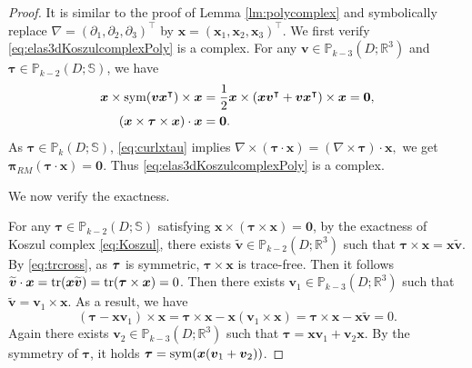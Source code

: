 \begin{proof}
It is similar to the proof of Lemma \ref{lm:polycomplex} and symbolically replace $\nabla = (\partial_1, \partial_2, \partial_3)^{\intercal}$ by $\boldsymbol  x = (\boldsymbol  x_1, \boldsymbol  x_2, \boldsymbol  x_3)^{\intercal}$. 
We first verify \eqref{eq:elas3dKoszulcomplexPoly} is a complex. For any $\boldsymbol v\in\mathbb P_{k-3}(D;\mathbb R^3)$ and $\boldsymbol\tau\in\mathbb P_{k-2}(D;\mathbb S)$, we have
\begin{align*}
\boldsymbol x\times \operatorname{sym}(\boldsymbol v\boldsymbol x^{\intercal})\times \boldsymbol x &=\frac{1}{2}\boldsymbol x\times(\boldsymbol x\boldsymbol v^{\intercal} + \boldsymbol  v\boldsymbol  x^{\intercal})\times \boldsymbol  x=\boldsymbol0,\\
(\boldsymbol x\times\boldsymbol\tau \times \boldsymbol  x)\cdot \boldsymbol  x &=\boldsymbol 0.
\end{align*}
As $\boldsymbol\tau\in\mathbb P_{k}(D;\mathbb S)$, \eqref{eq:curlxtau} implies
$\nabla \times( \boldsymbol  \tau\cdot \boldsymbol  x) =(\nabla\times \boldsymbol\tau )\cdot \boldsymbol  x,$
we get
$\boldsymbol \pi_{RM}(\boldsymbol\tau\cdot \boldsymbol  x)= \boldsymbol  0.$
Thus \eqref{eq:elas3dKoszulcomplexPoly} is a complex.

We now verify the exactness.  

\medskip
{}

For any $\boldsymbol \tau\in\mathbb P_{k-2}(D;\mathbb S)$ satisfying $\boldsymbol x\times(\boldsymbol\tau \times \boldsymbol x)=\boldsymbol  0$, by the exactness of Koszul complex \eqref{eq:Koszul}, there exists $\widetilde{\boldsymbol v}\in \mathbb P_{k-2}(D;\mathbb R^3)$ such that $\boldsymbol\tau \times \boldsymbol x=\boldsymbol x\widetilde{\boldsymbol v}$.
By \eqref{eq:trcross}, as $\boldsymbol \tau$ is symmetric, $\boldsymbol\tau \times \boldsymbol x$ is trace-free. Then it follows $\widetilde{\boldsymbol v}\cdot \boldsymbol  x = \operatorname*{tr}(\boldsymbol  x\widetilde{\boldsymbol v} ) = \operatorname*{tr} (\boldsymbol  \tau \times \boldsymbol  x) = 0$. Then there exists $\boldsymbol  v_1\in\mathbb P_{k-3}(D;\mathbb R^3)$ such that $\widetilde{\boldsymbol v}=\boldsymbol  v_1\times \boldsymbol x$. As a result, we have
$$
(\boldsymbol\tau-\boldsymbol x\boldsymbol  v_1)\times \boldsymbol x=\boldsymbol\tau \times \boldsymbol x-\boldsymbol x(\boldsymbol  v_1\times \boldsymbol x)= \boldsymbol\tau \times \boldsymbol x-\boldsymbol x \widetilde{\boldsymbol v} = 0.
$$
Again there exists $\boldsymbol v_2\in \mathbb P_{k-3}(D;\mathbb R^3)$ such that $\boldsymbol\tau=\boldsymbol x\boldsymbol v_1+\boldsymbol v_2\boldsymbol x$. By the symmetry of $\boldsymbol\tau$, it holds $\boldsymbol\tau=\operatorname{sym}(\boldsymbol  x(\boldsymbol v_1+\boldsymbol v_2))$. 


\end{proof}

